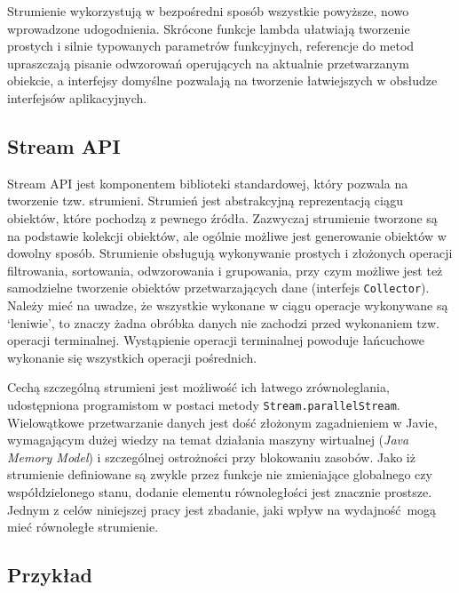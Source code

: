 \documentclass[12pt,twoside,openright]{extarticle}
\begin{document}
    Strumienie wykorzystują w bezpośredni sposób wszystkie powyższe, nowo wprowadzone udogodnienia. Skrócone funkcje lambda ułatwiają tworzenie prostych i silnie typowanych parametrów funkcyjnych, referencje do metod upraszczają pisanie odwzorowań operujących na aktualnie przetwarzanym obiekcie, a interfejsy domyślne pozwalają na tworzenie łatwiejszych w obsłudze interfejsów aplikacyjnych.

\subsection{Stream API}

    Stream API jest komponentem biblioteki standardowej, który pozwala na tworzenie tzw. strumieni. Strumień jest abstrakcyjną reprezentacją ciągu obiektów, które pochodzą z pewnego źródła. Zazwyczaj strumienie tworzone są na podstawie kolekcji obiektów, ale ogólnie możliwe jest generowanie obiektów w dowolny sposób. Strumienie obsługują wykonywanie prostych i złożonych operacji filtrowania, sortowania, odwzorowania i grupowania, przy czym możliwe jest też samodzielne tworzenie obiektów przetwarzających dane (interfejs \texttt{Collector}). Należy mieć na uwadze, że wszystkie wykonane w ciągu operacje wykonywane są `leniwie', to znaczy żadna obróbka danych nie zachodzi przed wykonaniem tzw. operacji terminalnej. Wystąpienie operacji terminalnej powoduje łańcuchowe wykonanie się wszystkich operacji pośrednich.

    Cechą szczególną strumieni jest możliwość ich łatwego zrównoleglania, udostępniona programistom w postaci metody \texttt{Stream.parallelStream}. Wielowątkowe przetwarzanie danych jest dość złożonym zagadnieniem w Javie, wymagającym dużej wiedzy na temat działania maszyny wirtualnej (\textit{Java Memory Model}) i szczególnej ostrożności przy blokowaniu zasobów. Jako iż strumienie definiowane są zwykle przez funkcje nie zmieniające globalnego czy współdzielonego stanu, dodanie elementu równoległości jest znacznie prostsze. Jednym z celów niniejszej pracy jest zbadanie, jaki wpływ na wydajność mogą mieć równoległe strumienie.

\subsection{Przykład}
\end{document}
